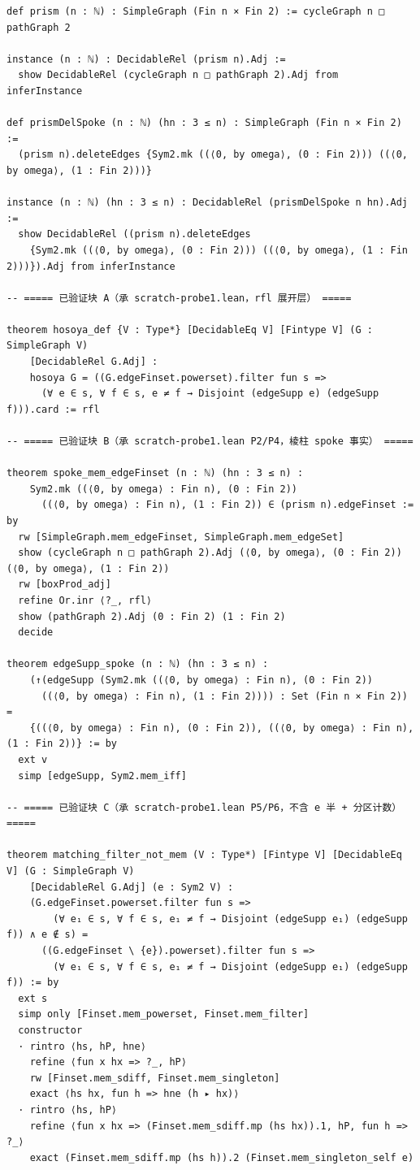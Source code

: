 \documentclass[11pt]{article}
\theoremstyle{definition}
\begin{document}
\begin{lstlisting}
def prism (n : ℕ) : SimpleGraph (Fin n × Fin 2) := cycleGraph n □ pathGraph 2

instance (n : ℕ) : DecidableRel (prism n).Adj :=
  show DecidableRel (cycleGraph n □ pathGraph 2).Adj from inferInstance

def prismDelSpoke (n : ℕ) (hn : 3 ≤ n) : SimpleGraph (Fin n × Fin 2) :=
  (prism n).deleteEdges {Sym2.mk ((⟨0, by omega⟩, (0 : Fin 2))) ((⟨0, by omega⟩, (1 : Fin 2)))}

instance (n : ℕ) (hn : 3 ≤ n) : DecidableRel (prismDelSpoke n hn).Adj :=
  show DecidableRel ((prism n).deleteEdges
    {Sym2.mk ((⟨0, by omega⟩, (0 : Fin 2))) ((⟨0, by omega⟩, (1 : Fin 2)))}).Adj from inferInstance

-- ===== 已验证块 A（承 scratch-probe1.lean，rfl 展开层） =====

theorem hosoya_def {V : Type*} [DecidableEq V] [Fintype V] (G : SimpleGraph V)
    [DecidableRel G.Adj] :
    hosoya G = ((G.edgeFinset.powerset).filter fun s =>
      (∀ e ∈ s, ∀ f ∈ s, e ≠ f → Disjoint (edgeSupp e) (edgeSupp f))).card := rfl

-- ===== 已验证块 B（承 scratch-probe1.lean P2/P4，棱柱 spoke 事实） =====

theorem spoke_mem_edgeFinset (n : ℕ) (hn : 3 ≤ n) :
    Sym2.mk ((⟨0, by omega⟩ : Fin n), (0 : Fin 2))
      ((⟨0, by omega⟩ : Fin n), (1 : Fin 2)) ∈ (prism n).edgeFinset := by
  rw [SimpleGraph.mem_edgeFinset, SimpleGraph.mem_edgeSet]
  show (cycleGraph n □ pathGraph 2).Adj (⟨0, by omega⟩, (0 : Fin 2)) (⟨0, by omega⟩, (1 : Fin 2))
  rw [boxProd_adj]
  refine Or.inr ⟨?_, rfl⟩
  show (pathGraph 2).Adj (0 : Fin 2) (1 : Fin 2)
  decide

theorem edgeSupp_spoke (n : ℕ) (hn : 3 ≤ n) :
    (↑(edgeSupp (Sym2.mk ((⟨0, by omega⟩ : Fin n), (0 : Fin 2))
      ((⟨0, by omega⟩ : Fin n), (1 : Fin 2)))) : Set (Fin n × Fin 2)) =
    {((⟨0, by omega⟩ : Fin n), (0 : Fin 2)), ((⟨0, by omega⟩ : Fin n), (1 : Fin 2))} := by
  ext v
  simp [edgeSupp, Sym2.mem_iff]

-- ===== 已验证块 C（承 scratch-probe1.lean P5/P6，不含 e 半 + 分区计数） =====

theorem matching_filter_not_mem (V : Type*) [Fintype V] [DecidableEq V] (G : SimpleGraph V)
    [DecidableRel G.Adj] (e : Sym2 V) :
    (G.edgeFinset.powerset.filter fun s =>
        (∀ e₁ ∈ s, ∀ f ∈ s, e₁ ≠ f → Disjoint (edgeSupp e₁) (edgeSupp f)) ∧ e ∉ s) =
      ((G.edgeFinset \ {e}).powerset).filter fun s =>
        (∀ e₁ ∈ s, ∀ f ∈ s, e₁ ≠ f → Disjoint (edgeSupp e₁) (edgeSupp f)) := by
  ext s
  simp only [Finset.mem_powerset, Finset.mem_filter]
  constructor
  · rintro ⟨hs, hP, hne⟩
    refine ⟨fun x hx => ?_, hP⟩
    rw [Finset.mem_sdiff, Finset.mem_singleton]
    exact ⟨hs hx, fun h => hne (h ▸ hx)⟩
  · rintro ⟨hs, hP⟩
    refine ⟨fun x hx => (Finset.mem_sdiff.mp (hs hx)).1, hP, fun h => ?_⟩
    exact (Finset.mem_sdiff.mp (hs h)).2 (Finset.mem_singleton_self e)


\end{lstlisting}
\end{document}
